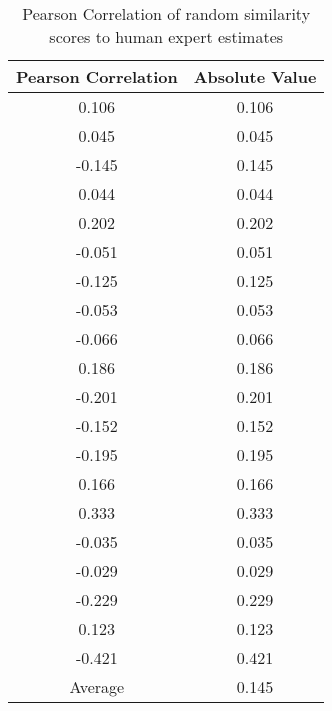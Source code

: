 \documentclass{article}
\begin{document}
\begin{table}[h!]
\centering
\begin{tabular}{|c|c|}
	\hline
	Pearson Correlation & Absolute Value \\
	\hline
	0.106 & 0.106 \\
	0.045 & 0.045 \\
	-0.145 & 0.145 \\
	0.044 & 0.044 \\
	0.202 & 0.202 \\
	-0.051 & 0.051 \\
	-0.125 & 0.125 \\
	-0.053 & 0.053 \\
	-0.066 & 0.066 \\
	0.186 & 0.186 \\
	-0.201 & 0.201 \\
	-0.152 & 0.152 \\
	-0.195 & 0.195 \\
	0.166 & 0.166 \\
	0.333 & 0.333 \\
	-0.035 & 0.035 \\
	-0.029 & 0.029 \\
	-0.229 & 0.229 \\
	0.123 & 0.123 \\
	-0.421 & 0.421 \\
	\hline
	\hline
	Average & 0.145\\
	\hline
\end{tabular}
\caption{Pearson Correlation of random similarity scores to human expert estimates}
\label{table:randomresults}
\end{table}
\end{document}
